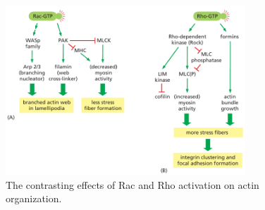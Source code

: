 \documentclass[../main.tex]{subfiles}
\begin{document}
\begin{figure}[H]
	\centering
	\includegraphics[width = 0.8\textwidth]{45}
	\caption{The contrasting effects of Rac and Rho activation on actin organization.}
\end{figure}
\end{document}
